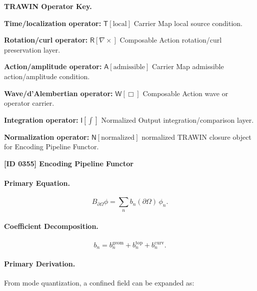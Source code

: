\par\vspace{0.45\baselineskip}
\noindent\begin{minipage}[t]{\linewidth}
\begingroup
\small
\raggedright
\textbf{TRAWIN Operator Key.}\par
\noindent\textbf{Time/localization operator:} $\mathsf{T}\!\left[\mathrm{local}\right]$ Carrier Map local source condition.\par
\noindent\textbf{Rotation/curl operator:} $\mathsf{R}\!\left[\nabla\times\right]$ Composable Action rotation/curl preservation layer.\par
\noindent\textbf{Action/amplitude operator:} $\mathsf{A}\!\left[\mathrm{admissible}\right]$ Carrier Map admissible action/amplitude condition.\par
\noindent\textbf{Wave/d'Alembertian operator:} $\mathsf{W}\!\left[\Box\right]$ Composable Action wave or operator carrier.\par
\noindent\textbf{Integration operator:} $\mathsf{I}\!\left[\int\right]$ Normalized Output integration/comparison layer.\par
\noindent\textbf{Normalization operator:} $\mathsf{N}\!\left[\mathrm{normalized}\right]$ normalized TRAWIN closure object for Encoding Pipeline Functor.\par
\endgroup
\end{minipage}

\clearpage
\noindent\textbf{[ID 0355] Encoding Pipeline Functor}\par
\vspace{0.35em}
\paragraph{Primary Equation.}
\begin{equation}
B_{\partial\Omega}\phi
=
\sum_n b_n(\partial\Omega)\,\phi_n .
\end{equation}

\paragraph{Coefficient Decomposition.}
\begin{equation}
b_n
=
b_n^{\mathrm{geom}}
+
b_n^{\mathrm{top}}
+
b_n^{\mathrm{curv}} .
\end{equation}

\paragraph{Primary Derivation.}
From mode quantization, a confined field can be expanded as:

